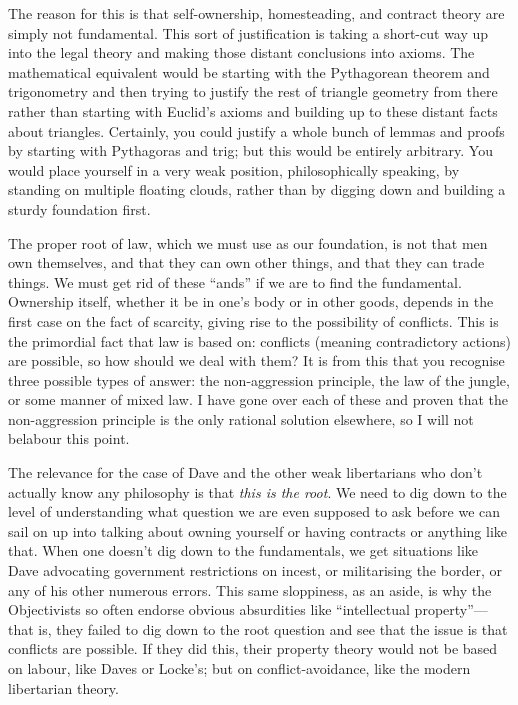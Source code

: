 \documentclass[11pt]{article}
\begin{document}
The reason for this is that self-ownership, homesteading, and contract theory are simply not fundamental. This sort of justification is taking a short-cut way up into the legal theory and making those distant conclusions into axioms. The mathematical equivalent would be starting with the Pythagorean theorem and trigonometry and then trying to justify the rest of triangle geometry from there rather than starting with Euclid's axioms and building up to these distant facts about triangles. Certainly, you could justify a whole bunch of lemmas and proofs by starting with Pythagoras and trig; but this would be entirely arbitrary. You would place yourself in a very weak position, philosophically speaking, by standing on multiple floating clouds, rather than by digging down and building a sturdy foundation first.

The proper root of law, which we must use as our foundation, is not that men own themselves, and that they can own other things, and that they can trade things. We must get rid of these ``ands'' if we are to find the fundamental. Ownership itself, whether it be in one's body or in other goods, depends in the first case on the fact of scarcity, giving rise to the possibility of conflicts. This is the primordial fact that law is based on: conflicts (meaning contradictory actions) are possible, so how should we deal with them? It is from this that you recognise three possible types of answer: the non-aggression principle, the law of the jungle, or some manner of mixed law. I have gone over each of these and proven that the non-aggression principle is the only rational solution elsewhere, so I will not belabour this point.

The relevance for the case of Dave and the other weak libertarians who don't actually know any philosophy is that \emph{this is the root}. We need to dig down to the level of understanding what question we are even supposed to ask before we can sail on up into talking about owning yourself or having contracts or anything like that. When one doesn't dig down to the fundamentals, we get situations like Dave advocating government restrictions on incest, or militarising the border, or any of his other numerous errors. This same sloppiness, as an aside, is why the Objectivists so often endorse obvious absurdities like ``intellectual property''---that is, they failed to dig down to the root question and see that the issue is that conflicts are possible. If they did this, their property theory would not be based on labour, like Daves or Locke's; but on conflict-avoidance, like the modern libertarian theory.
\end{document}
